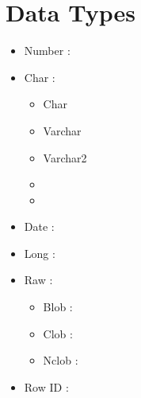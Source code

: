 \section{Data Types}
\begin{itemize}
    \item Number  :
    \item Char :
        \begin{itemize}
            \item Char 
            \item Varchar
            \item Varchar2
            \item
            \item
        \end{itemize}
    \item Date :
    \item Long :
    \item Raw : 
        \begin{itemize}
            \item Blob :
            \item Clob : 
            \item Nclob :
        \end{itemize}
    \item Row ID : 
\end{itemize}

